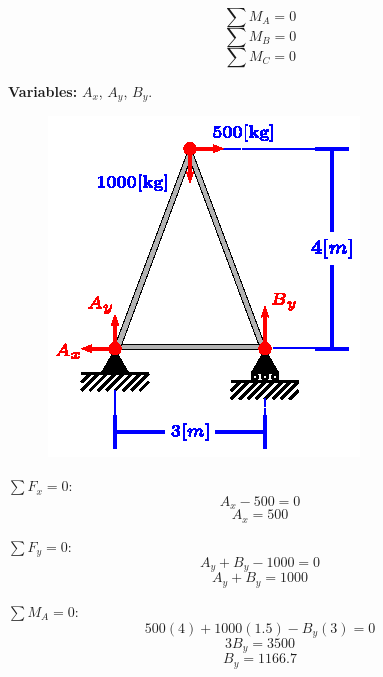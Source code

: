 \documentclass[letter,10pt,twoside]{article}
\begin{document}
\begin{equation*}
    \sum{M_A} = 0
\end{equation*}
\begin{equation*}
    \sum{M_B} = 0
\end{equation*}
\begin{equation*}
    \sum{M_C} = 0
\end{equation*}

\textbf{Variables:} $A_x$, $A_y$, $B_y$.
\\

\begin{figure}[H]
\centering
\includegraphics[scale=1.8]{resources/h04.eps}
\end{figure}

$\sum{F_x} = 0$:
\begin{equation*}
    A_x - 500 = 0
\end{equation*}
\begin{equation*}
    A_x = 500
\end{equation*}

$\sum{F_y} = 0$:
\begin{equation*}
    A_y + B_y - 1000 = 0
\end{equation*}
\begin{equation*}
    A_y + B_y = 1000
\end{equation*}

$\sum{M_A} = 0$:
\begin{equation*}
    500(4) + 1000(1.5) - B_y(3) = 0
\end{equation*}
\begin{equation*}
    3 B_y = 3500
\end{equation*}
\begin{equation*}
    B_y = 1166.7
\end{equation*}
\end{document}
